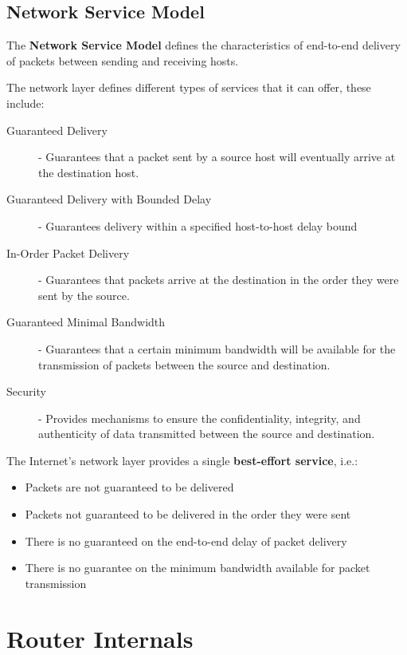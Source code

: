 \documentclass[12pt letter]{report}
\begin{document}
\section{Network Service Model}

The \textbf{Network Service Model} defines the characteristics of
end-to-end delivery of packets between sending and receiving hosts.

The network layer defines different types of services that it can
offer, these include:
\begin{description}
  \item[Guaranteed Delivery] - Guarantees that a packet sent by a
    source host will eventually arrive at the destination host.
  \item[Guaranteed Delivery with Bounded Delay] - Guarantees delivery
    within a specified host-to-host delay bound
  \item[In-Order Packet Delivery] - Guarantees that packets arrive at
    the destination in the order they were sent by the source.
  \item[Guaranteed Minimal Bandwidth] - Guarantees that a certain
    minimum bandwidth will be
    available for the transmission of packets between the source and
    destination.
  \item[Security] - Provides mechanisms to ensure the
    confidentiality, integrity, and authenticity of data transmitted
    between the source and destination.
\end{description}

The Internet's  network layer provides a single \textbf{best-effort
service}, i.e.:
\begin{itemize}
  \item Packets are not guaranteed to be delivered
  \item Packets not guaranteed to be delivered in the order they were sent
  \item There is no guaranteed on the end-to-end delay of packet delivery
  \item There is no guarantee on the minimum bandwidth available for packet
    transmission
\end{itemize}

\chapter{Router Internals}
\end{document}
